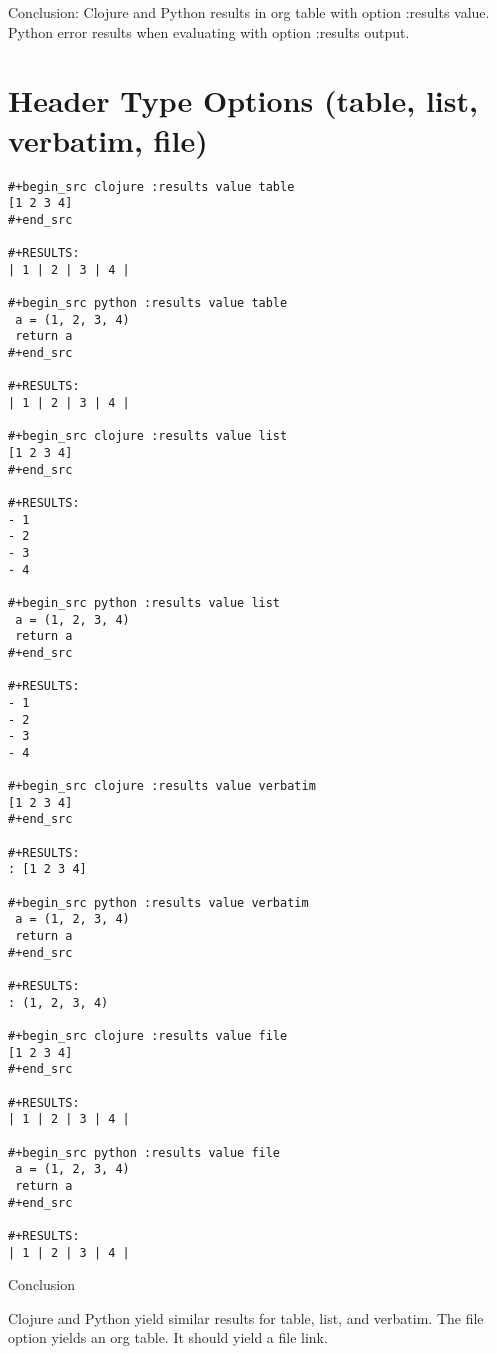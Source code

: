 \documentclass[11pt]{article}
\begin{document}
Conclusion:  Clojure and Python results in org table with option :results value.
Python error results when evaluating with option :results output.
\newpage
\section{Header Type Options (table, list, verbatim, file)}
\label{sec-4}

\begin{verbatim}
#+begin_src clojure :results value table
[1 2 3 4]
#+end_src

#+RESULTS:
| 1 | 2 | 3 | 4 |

#+begin_src python :results value table
 a = (1, 2, 3, 4)
 return a
#+end_src

#+RESULTS:
| 1 | 2 | 3 | 4 |

#+begin_src clojure :results value list
[1 2 3 4]
#+end_src

#+RESULTS:
- 1
- 2
- 3
- 4

#+begin_src python :results value list
 a = (1, 2, 3, 4)
 return a
#+end_src

#+RESULTS:
- 1
- 2
- 3
- 4

#+begin_src clojure :results value verbatim
[1 2 3 4]
#+end_src

#+RESULTS:
: [1 2 3 4]

#+begin_src python :results value verbatim
 a = (1, 2, 3, 4)
 return a
#+end_src

#+RESULTS:
: (1, 2, 3, 4)

#+begin_src clojure :results value file
[1 2 3 4]
#+end_src

#+RESULTS:
| 1 | 2 | 3 | 4 |

#+begin_src python :results value file
 a = (1, 2, 3, 4)
 return a
#+end_src

#+RESULTS:
| 1 | 2 | 3 | 4 |
\end{verbatim}

Conclusion

Clojure and Python yield similar results for table, list, and verbatim.
The file option yields an org table.  It should yield a file link.
\newpage
\end{document}
